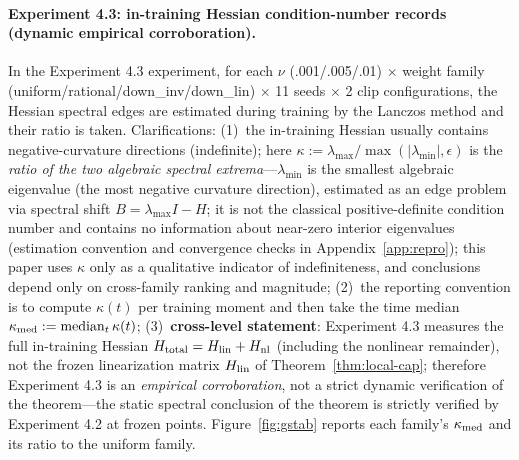 \documentclass[11pt]{article}
\numberwithin{equation}{section}
\begin{document}
\paragraph{Experiment 4.3: in-training Hessian condition-number records (dynamic empirical corroboration).}
In the Experiment 4.3 experiment, for each $\nu$ (.001/.005/.01) $\times$ weight family (uniform/rational/down\_inv/down\_lin) $\times$ 11 seeds $\times$ 2 clip configurations, the Hessian spectral edges are estimated during training by the Lanczos method and their ratio is taken. Clarifications: (1)~the in-training Hessian usually contains negative-curvature directions (indefinite); here $\kappa:=\lambda_{\max}/\max(|\lambda_{\min}|,\epsilon)$ is the \emph{ratio of the two algebraic spectral extrema}---$\lambda_{\min}$ is the smallest algebraic eigenvalue (the most negative curvature direction), estimated as an edge problem via spectral shift $B=\lambda_{\max}I-H$; it is not the classical positive-definite condition number and contains no information about near-zero interior eigenvalues (estimation convention and convergence checks in Appendix~\ref{app:repro}); this paper uses $\kappa$ only as a qualitative indicator of indefiniteness, and conclusions depend only on cross-family ranking and magnitude; (2)~the reporting convention is to compute $\kappa(t)$ per training moment and then take the time median $\kappa_{\rm med}:=\operatorname{median}_t\kappa(t)$; (3)~\textbf{cross-level statement}: Experiment 4.3 measures the full in-training Hessian $H_{\rm total}=H_{\rm lin}+H_{\rm nl}$ (including the nonlinear remainder), not the frozen linearization matrix $H_{\rm lin}$ of Theorem~\ref{thm:local-cap}; therefore Experiment 4.3 is an \emph{empirical corroboration}, not a strict dynamic verification of the theorem---the static spectral conclusion of the theorem is strictly verified by Experiment 4.2 at frozen points. Figure~\ref{fig:gstab} reports each family's $\kappa_{\rm med}$ and its ratio to the uniform family.
\end{document}
